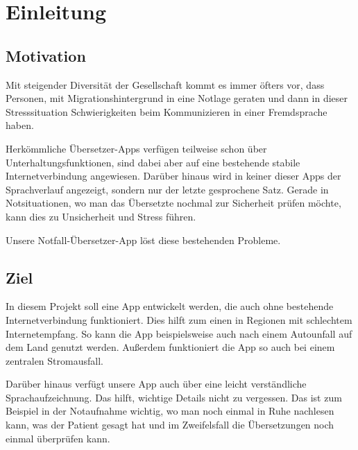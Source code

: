 \newpage
\section{Einleitung}\label{sec:introduction}

\subsection{Motivation}
Mit steigender Diversität der Gesellschaft kommt es immer öfters vor, dass Personen, mit Migrationshintergrund in eine Notlage geraten und dann in dieser Stresssituation Schwierigkeiten beim Kommunizieren in einer Fremdsprache haben.

Herkömmliche Übersetzer-Apps verfügen teilweise schon über Unterhaltungsfunktionen, sind dabei aber auf eine bestehende stabile Internetverbindung angewiesen. Darüber hinaus wird in keiner dieser Apps der Sprachverlauf angezeigt, sondern nur der letzte gesprochene Satz. Gerade in Notsituationen, wo man das Übersetzte nochmal zur Sicherheit prüfen möchte, kann dies zu Unsicherheit und Stress führen.

Unsere Notfall-Übersetzer-App löst diese bestehenden Probleme.

\subsection{Ziel}
In diesem Projekt soll eine App entwickelt werden, die auch ohne bestehende Internetverbindung funktioniert. Dies hilft zum einen in Regionen mit schlechtem Internetempfang. So kann die App beispielsweise auch nach einem Autounfall auf dem Land genutzt werden. Außerdem funktioniert die App so auch bei einem zentralen Stromausfall.

Darüber hinaus verfügt unsere App auch über eine leicht verständliche Sprachaufzeichnung. Das hilft, wichtige Details nicht zu vergessen. Das ist zum Beispiel in der Notaufnahme wichtig, wo man noch einmal in Ruhe nachlesen kann, was der Patient gesagt hat und im Zweifelsfall die Übersetzungen noch einmal überprüfen kann.